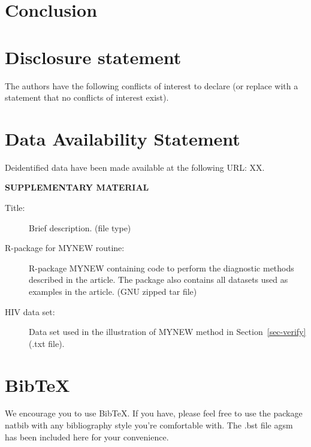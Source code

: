 \documentclass[
  12pt]{article}
\begin{document}
\addtolength{\textheight}{-.2in}%

\section{Conclusion}\label{sec-conc}

\section{Disclosure statement}\label{disclosure-statement}

The authors have the following conflicts of interest to declare (or
replace with a statement that no conflicts of interest exist).

\section{Data Availability Statement}\label{data-availability-statement}

Deidentified data have been made available at the following URL: XX.

\label{supplementary-material}
\bigskip

\begin{center}

{\large\bf SUPPLEMENTARY MATERIAL}

\end{center}

\begin{description}
\item[Title:]
Brief description. (file type)
\item[R-package for MYNEW routine:]
R-package MYNEW containing code to perform the diagnostic methods
described in the article. The package also contains all datasets used as
examples in the article. (GNU zipped tar file)
\item[HIV data set:]
Data set used in the illustration of MYNEW method in
Section~\ref{sec-verify} (.txt file).
\end{description}

\section{BibTeX}\label{bibtex}

We encourage you to use BibTeX. If you have, please feel free to use the
package natbib with any bibliography style you're comfortable with. The
.bst file agsm has been included here for your convenience.


  
\end{document}
